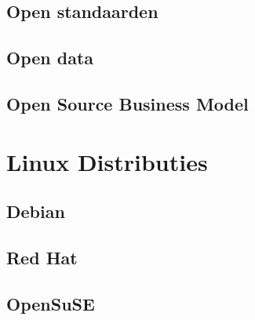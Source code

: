 \documentclass[a4paper,12pt,twoside,openright,titlepage]{book}
\begin{document}
\section{Open standaarden}

\section{Open data}

\section{Open Source Business Model}


\chapter{Linux Distributies}

\section{Debian}

\section{Red Hat}

\section{OpenSuSE}


\backmatter
\printindex
\end{document}
